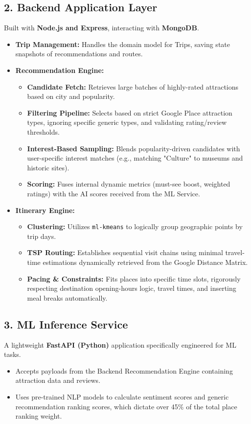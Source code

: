 \documentclass[12pt, a4paper]{article}
\begin{document}
\subsection*{2. Backend Application Layer}
Built with \textbf{Node.js and Express}, interacting with \textbf{MongoDB}.
\begin{itemize}
    \item \textbf{Trip Management:} Handles the domain model for Trips, saving state snapshots of recommendations and routes.
    \item \textbf{Recommendation Engine:}
    \begin{itemize}
        \item \textbf{Candidate Fetch:} Retrieves large batches of highly-rated attractions based on city and popularity.
        \item \textbf{Filtering Pipeline:} Selects based on strict Google Place attraction types, ignoring specific generic types, and validating rating/review thresholds.
        \item \textbf{Interest-Based Sampling:} Blends popularity-driven candidates with user-specific interest matches (e.g., matching "Culture" to museums and historic sites).
        \item \textbf{Scoring:} Fuses internal dynamic metrics (must-see boost, weighted ratings) with the AI scores received from the ML Service.
    \end{itemize}
    \item \textbf{Itinerary Engine:}
    \begin{itemize}
        \item \textbf{Clustering:} Utilizes \texttt{ml-kmeans} to logically group geographic points by trip days.
        \item \textbf{TSP Routing:} Establishes sequential visit chains using minimal travel-time estimations dynamically retrieved from the Google Distance Matrix.
        \item \textbf{Pacing \& Constraints:} Fits places into specific time slots, rigorously respecting destination opening-hours logic, travel times, and inserting meal breaks automatically.
    \end{itemize}
\end{itemize}

\subsection*{3. ML Inference Service}
A lightweight \textbf{FastAPI (Python)} application specifically engineered for ML tasks.
\begin{itemize}
    \item Accepts payloads from the Backend Recommendation Engine containing attraction data and reviews.
    \item Uses pre-trained NLP models to calculate sentiment scores and generic recommendation ranking scores, which dictate over 45\% of the total place ranking weight.
\end{itemize}
\end{document}
